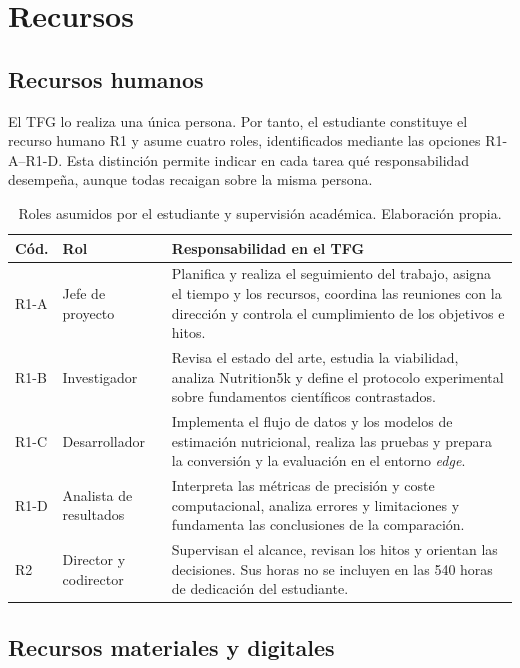 \clearpage
\section{Recursos}
\label{sec:planificacion-recursos}

\subsection{Recursos humanos}

El TFG lo realiza una única persona. Por tanto, el estudiante constituye el
recurso humano R1 y asume cuatro roles, identificados mediante las opciones
R1-A--R1-D. Esta distinción permite indicar en cada tarea qué responsabilidad
desempeña, aunque todas recaigan sobre la misma persona.

\begin{table}[H]
  \centering
  \small
  \begin{tabularx}{\textwidth}{C{1.25cm}L{3.0cm}Y}
    \toprule
    \textbf{Cód.} & \textbf{Rol} & \textbf{Responsabilidad en el TFG} \\
    \midrule
    R1-A & Jefe de proyecto & Planifica y realiza el seguimiento del trabajo, asigna el tiempo y los recursos, coordina las reuniones con la dirección y controla el cumplimiento de los objetivos e hitos. \\
    R1-B & Investigador & Revisa el estado del arte, estudia la viabilidad, analiza Nutrition5k y define el protocolo experimental sobre fundamentos científicos contrastados. \\
    R1-C & Desarrollador & Implementa el flujo de datos y los modelos de estimación nutricional, realiza las pruebas y prepara la conversión y la evaluación en el entorno \emph{edge}. \\
    R1-D & Analista de resultados & Interpreta las métricas de precisión y coste computacional, analiza errores y limitaciones y fundamenta las conclusiones de la comparación. \\
    R2 & Director y codirector & Supervisan el alcance, revisan los hitos y orientan las decisiones. Sus horas no se incluyen en las 540 horas de dedicación del estudiante. \\
    \bottomrule
  \end{tabularx}
  \caption[Recursos humanos]{Roles asumidos por el estudiante y supervisión
  académica. Elaboración propia.}
  \label{tab:planificacion-recursos-humanos}
\end{table}

\subsection{Recursos materiales y digitales}


